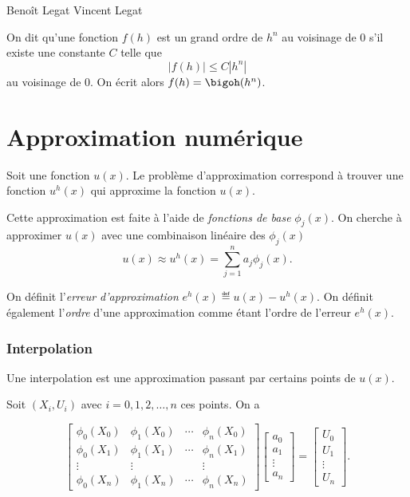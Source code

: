 

\newcommand\fv[1]{{\bf #1}} %

\usepackage{listings}
\usepackage{numprint}
\DeclareMathOperator{\dist}{dist}

{Beno\^it Legat}
{Vincent Legat}


\begin{mydef}
  On dit qu'une fonction $f(h)$ est un grand ordre de $h^n$ au voisinage
  de 0 s'il existe une constante $C$ telle que
  \[ |f(h)| \leq C |h^n| \]
  au voisinage de 0.
  On écrit alors $f(h) = \bigoh(h^n)$.
\end{mydef}

\part{Approximation numérique}
Soit une fonction $u(x)$.
Le problème d'approximation correspond à trouver une fonction
$u^h(x)$ qui approxime la fonction $u(x)$.

Cette approximation est faite à l'aide de \emph{fonctions de base} $\phi_j(x)$.
On cherche à approximer $u(x)$ avec une combinaison linéaire des $\phi_j(x)$
\[ u(x) \approx u^h(x) = \sum_{j=1}^n a_j \phi_j(x). \]

On définit l'\emph{erreur d'approximation} $e^h(x) \eqdef u(x) - u^h(x)$.
On définit également l'\emph{ordre} d'une approximation comme étant l'ordre de
l'erreur $e^h(x)$.

\section{Interpolation}
Une interpolation est une approximation passant par certains points de $u(x)$.

Soit $(X_i, U_i)$ avec $i = 0, 1, 2, \ldots, n$ ces points. On a

\[\begin{bmatrix}
	\phi_0(X_0) & \phi_1(X_0) & \cdots & \phi_n(X_0)  \\
	\phi_0(X_1) & \phi_1(X_1)	& \cdots & \phi_n(X_1)  \\
	\vdots			& \vdots 			& 			 & \vdots \\
	\phi_0(X_n) & \phi_1(X_n)	& \cdots & \phi_n(X_n)
\end{bmatrix}
\begin{bmatrix}
	a_0 			\\
	a_1 			\\
	\vdots	\\
	a_n 			
\end{bmatrix}
=
\begin{bmatrix}
	U_0 			\\
	U_1 			\\
	\vdots	\\
	U_n 			
\end{bmatrix}.\]

